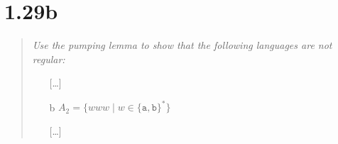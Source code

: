 \section{1.29b}

\begin{quote}\color{black!80}\slshape
  Use the pumping lemma to show that the following languages are not regular:
  \begin{itemize}
    \item[] [\dots]
    \item[b] $A_2 = \{ www \mid w \in \{\mathtt a, \mathtt b\}^{*} \} $
    \item[] [\dots]
  \end{itemize}
  \cite[p.~88]{Sipser}
\end{quote}
